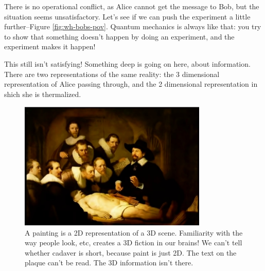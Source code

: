 \documentclass[]{article}
\begin{document}
There is no operational conflict, as Alice cannot get the message to Bob, but the situation seems unsatisfactory. Let's see if we can push the experiment a little further--Figure \ref{fig:wh-bobs-pov}. Quantum mechanics is always like that: you try to show that something doesn't happen by doing an experiment, and the experiment makes it happen!

This still isn't satisfying! Something deep is going on here, about information.
There are two representations of the same reality: the 3 dimensional representation of Alice passing through, and the 2 dimensional representation in shich she is thermalized.

\begin{figure}[H]
	\begin{center}
		\caption[A painting is a 2D representation of a 3D scene]{A painting is a 2D representation of a 3D scene. Familiarity with the way people look, etc, creates a 3D fiction in our brains! We can't tell whether cadaver is short, because paint is just 2D. The text on the plaque can't be read. The 3D information isn't there.}
		\includegraphics[width=0.8\textwidth]{wh-painting}
	\end{center}
\end{figure}
\end{document}
